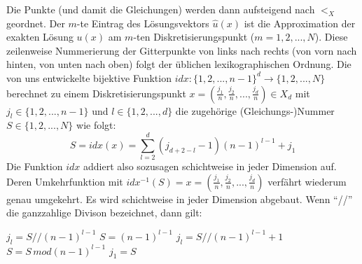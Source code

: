 \documentclass{scrartcl}
\begin{document}
Die Punkte (und damit die Gleichungen) werden dann aufsteigend nach $<_X$ geordnet. Der $m$-te Eintrag des Lösungsvektors $\hat{u}(x)$ ist die Approximation der exakten Lösung $u(x)$ am $m$-ten Diskretisierungspunkt ($m = 1, 2, ..., N$). Diese zeilenweise Nummerierung der Gitterpunkte von links nach rechts (von vorn nach hinten, von unten nach oben) folgt der üblichen lexikographischen Ordnung.
Die von uns entwickelte bijektive Funktion $idx: \lbrace1, 2, ..., n-1\rbrace^d \to \lbrace1, 2, ..., N\rbrace$ berechnet zu einem Diskretisierungspunkt 
$x = (\frac{j_1}{n}, \frac{j_2}{n}, ..., \frac{j_d}{n}) \in X_d$ mit $j_l \in \lbrace1, 2, ..., n-1\rbrace$ und $l \in \lbrace1, 2, ..., d\rbrace$ die zugehörige (Gleichungs-)Nummer $S \in \lbrace1, 2, ..., N\rbrace$ wie folgt:
\[S=idx(x) = \sum_{l=2}^{d} (j_{d+2-l}-1)(n-1)^{l-1}+j_1 \]
Die Funktion $idx$ addiert also sozusagen schichtweise in jeder Dimension auf.
Deren Umkehrfunktion mit $idx^{-1}(S) = x = (\frac{j_1}{n}, \frac{j_2}{n}, ..., \frac{j_d}{n})$ verfährt wiederum genau umgekehrt. Es wird schichtweise in jeder Dimension abgebaut. Wenn "`//"' die ganzzahlige Divison bezeichnet, dann gilt:

\begin{algorithmic}
      \State $j_l=S//(n-1)^{l-1}$
      \State $S = (n-1)^{l-1}$
    \Else
      \State $j_l=S//(n-1)^{l-1} + 1$
      \State $S = S \, mod(n-1)^{l-1}$
    \EndIf
  \EndFor
  \State $j_1 = S$
\end{algorithmic}

%
%
%
\end{document}
